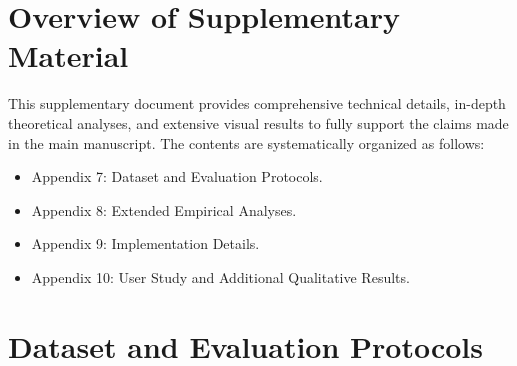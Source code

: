 \documentclass{llmxive}
\begin{document}
\section*{Overview of Supplementary Material}

This supplementary document provides comprehensive technical details, in-depth theoretical analyses, and extensive visual results to fully support the claims made in the main manuscript. The contents are systematically organized as follows:

\begin{itemize}
    \item Appendix 7: Dataset and Evaluation Protocols.
    \item Appendix 8: Extended Empirical Analyses.
    \item Appendix 9: Implementation Details.
    \item Appendix 10: User Study and Additional Qualitative Results.
\end{itemize}

\section{Dataset and Evaluation Protocols}
\end{document}
